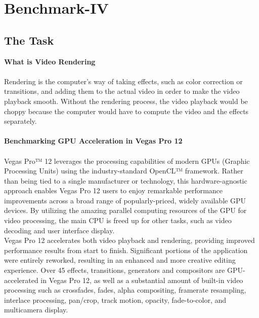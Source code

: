 \newpage
\chapter{Benchmark-IV}

\section{The Task}
\textbf{What is Video Rendering}\\\\
Rendering is the computer's way of taking effects, such as color correction or transitions, and adding them to the actual video in order to make the video playback smooth. Without the rendering process, the video playback would be choppy because the computer would have to compute the video and the effects separately.\\\\
\textbf{Benchmarking GPU Acceleration in Vegas Pro 12}\\\\
Vegas Pro™ 12 leverages the processing capabilities of modern GPUs (Graphic Processing Units) using the industry-standard OpenCL™ framework. Rather than being tied to a single manufacturer or technology, this hardware-agnostic approach enables Vegas Pro 12 users to enjoy remarkable performance improvements across a broad range of popularly-priced, widely available GPU devices. By utilizing the amazing parallel computing resources of the GPU for video processing, the main CPU is freed up for other tasks, such as video decoding and user interface display.\\
Vegas Pro 12 accelerates both video playback and rendering, providing improved performance results from start to finish. Significant portions of the application were entirely reworked, resulting in an enhanced and more creative editing experience. Over 45 effects, transitions, generators and compositors are GPU-accelerated in Vegas Pro 12, as well as a substantial amount of built-in video processing such as crossfades, fades, alpha compositing, framerate resampling, interlace processing, pan/crop, track motion, opacity, fade-to-color, and multicamera display.\\
